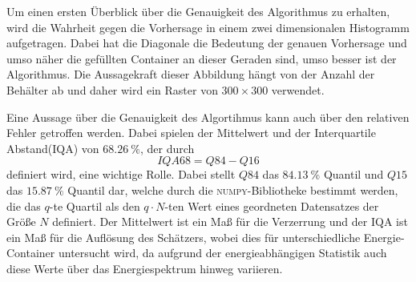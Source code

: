 Um einen ersten Überblick über die Genauigkeit des Algorithmus zu erhalten, wird die Wahrheit gegen die Vorhersage in einem
zwei dimensionalen Histogramm aufgetragen.
Dabei hat die Diagonale die Bedeutung der genauen Vorhersage und umso näher die gefüllten Container an dieser Geraden sind, umso besser
ist der Algorithmus.
Die Aussagekraft dieser Abbildung hängt von der Anzahl der Behälter ab und daher wird ein Raster von $300 \times 300$ verwendet.

Eine Aussage über die Genauigkeit des Algortihmus kann auch über den relativen Fehler getroffen werden. Dabei spielen der Mittelwert und der
Interquartile Abstand(IQA) von $\SI{68.26}{\percent}$, der durch
\begin{equation}
  IQA68 = Q84-Q16
\end{equation}
definiert wird, eine wichtige Rolle.
Dabei stellt $Q84$ das $\SI{84.13}{\percent}$ Quantil und $Q15$ das $\SI{15.87}{\percent}$ Quantil dar, welche durch die \textsc{numpy}-Bibliotheke
bestimmt werden, die das $q$-te Quartil als den $q \cdot N$-ten Wert eines geordneten Datensatzes der Größe $N$ definiert.
Der Mittelwert ist ein Maß für die Verzerrung und der IQA ist ein Maß für die Auflösung des Schätzers, wobei dies für unterschiedliche
Energie-Container untersucht wird, da aufgrund der energieabhängigen Statistik auch diese Werte über das Energiespektrum hinweg variieren.
